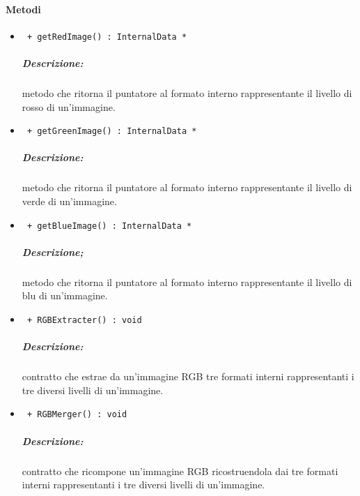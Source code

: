 \paragraph{Metodi \\}
	\begin{itemize}
		\item \color{blue}\verb! + getRedImage() : InternalData *! 
		\color{black}
		\subparagraph{Descrizione:} metodo che ritorna il puntatore al formato interno rappresentante il livello di rosso di un'immagine.
	
		\item \color{blue}\verb! + getGreenImage() : InternalData *!
		\color{black} 
		\subparagraph{Descrizione:} metodo che ritorna il puntatore al formato interno rappresentante il livello di verde di un'immagine.
		
		\item \color{blue}\verb! + getBlueImage() : InternalData *! 
		\color{black} 
		\subparagraph{Descrizione;} metodo che ritorna il puntatore al formato interno rappresentante il livello di blu di un'immagine.
		
		
		\item \color{blue}\verb! + RGBExtracter() : void! 
		\color{black}
		\subparagraph{Descrizione:} contratto che estrae da un'immagine RGB tre formati interni rappresentanti i tre diversi livelli di un'immagine.
		
		\item \color{blue}\verb! + RGBMerger() : void! 
		\color{black}
		\subparagraph{Descrizione:} contratto che ricompone un'immagine RGB ricostruendola dai tre formati interni rappresentanti i tre diversi livelli di un'immagine.
	\end{itemize}

	\pagebreak
\color{black}
